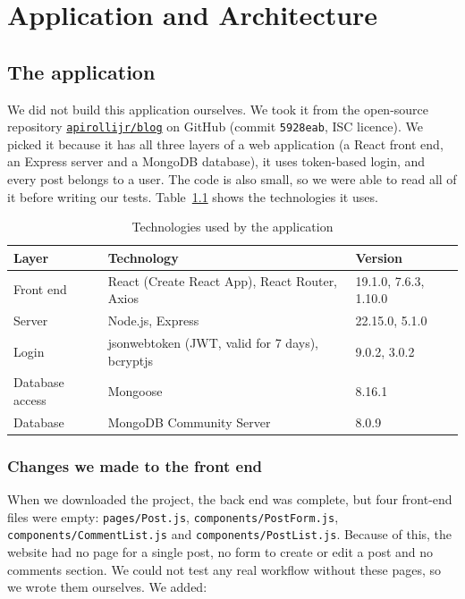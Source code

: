 \documentclass[12pt,a4paper,oneside]{report}
\newcommand{\code}[1]{\texttt{#1}}
\begin{document}
\chapter{Application and Architecture}\label{ch:arch}

\section{The application}

We did not build this application ourselves. We took it from the open-source
repository \href{https://github.com/apirollijr/blog}{\nolinkurl{apirollijr/blog}}
on GitHub (commit \code{5928eab}, ISC licence). We picked it because it has all
three layers of a web application (a React front end, an Express server and a
MongoDB database), it uses token-based login, and every post belongs to a user.
The code is also small, so we were able to read all of it before writing our
tests. Table~\ref{tab:stack} shows the technologies it uses.

\begin{table}[H]
\centering
\begin{tabular}{lll}
\toprule
\textbf{Layer} & \textbf{Technology} & \textbf{Version} \\
\midrule
Front end & React (Create React App), React Router, Axios & 19.1.0, 7.6.3, 1.10.0 \\
Server & Node.js, Express & 22.15.0, 5.1.0 \\
Login & jsonwebtoken (JWT, valid for 7 days), bcryptjs & 9.0.2, 3.0.2 \\
Database access & Mongoose & 8.16.1 \\
Database & MongoDB Community Server & 8.0.9 \\
\bottomrule
\end{tabular}
\caption{Technologies used by the application}
\label{tab:stack}
\end{table}

\subsection*{Changes we made to the front end}

When we downloaded the project, the back end was complete, but four front-end
files were empty: \code{pages/Post.js}, \code{components/PostForm.js},
\code{components/CommentList.js} and \code{components/PostList.js}. Because of
this, the website had no page for a single post, no form to create or edit a
post and no comments section. We could not test any real workflow without these
pages, so we wrote them ourselves. We added:
\end{document}
